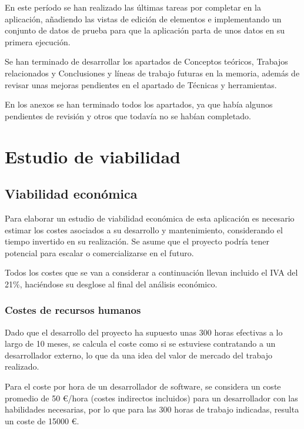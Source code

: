 En este período se han realizado las últimas tareas por completar en la aplicación, añadiendo las vistas de edición de elementos e implementando un conjunto de datos de prueba para que la aplicación parta de unos datos en su primera ejecución.

Se han terminado de desarrollar los apartados de Conceptos teóricos, Trabajos relacionados y Conclusiones y líneas de trabajo futuras en la memoria, además de revisar unas mejoras pendientes en el apartado de Técnicas y herramientas.

En los anexos se han terminado todos los apartados, ya que había algunos pendientes de revisión y otros que todavía no se habían completado.

\section{Estudio de viabilidad}

\subsection{Viabilidad económica}

Para elaborar un estudio de viabilidad económica de esta aplicación es necesario estimar los costes asociados a su desarrollo y mantenimiento, considerando el tiempo invertido en su realización. Se asume que el proyecto podría tener potencial para escalar o comercializarse en el futuro.

Todos los costes que se van a considerar a continuación llevan incluido el IVA del 21\%, haciéndose su desglose al final del análisis económico.

\subsubsection{Costes de recursos humanos}

Dado que el desarrollo del proyecto ha supuesto unas 300 horas efectivas a lo largo de 10 meses, se calcula el coste como si se estuviese contratando a un desarrollador externo, lo que da una idea del valor de mercado del trabajo realizado.

Para el coste por hora de un desarrollador de software, se considera un coste promedio de 50 €/hora (costes indirectos incluidos) para un desarrollador con las habilidades necesarias, por lo que para las 300 horas de trabajo indicadas, resulta un coste de \num{15000} €.

